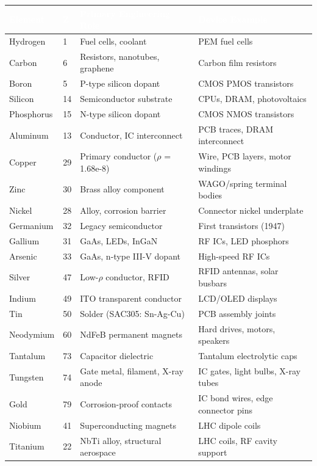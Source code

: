 \documentclass[11pt,letterpaper]{article}
\newcommand{\tableheader}[1]{\textbf{\sffamily\textcolor{white}{#1}}}
\begin{document}
\begin{center}
\begin{tabularx}{\textwidth}{L{1.8cm}C{0.7cm}XL{3cm}}
\toprule
{}
\tableheader{Element} & \tableheader{Z} & \tableheader{Primary Engineering Role} & \tableheader{Device Example} \\
\midrule
Hydrogen & 1 & Fuel cells, coolant & PEM fuel cells \\
Carbon & 6 & Resistors, nanotubes, graphene & Carbon film resistors \\
Boron & 5 & P-type silicon dopant & CMOS PMOS transistors \\
Silicon & 14 & Semiconductor substrate & CPUs, DRAM, photovoltaics \\
Phosphorus & 15 & N-type silicon dopant & CMOS NMOS transistors \\
Aluminum & 13 & Conductor, IC interconnect & PCB traces, DRAM interconnect \\
Copper & 29 & Primary conductor ($\rho$ = 1.68e-8) & Wire, PCB layers, motor windings \\
Zinc & 30 & Brass alloy component & WAGO/spring terminal bodies \\
Nickel & 28 & Alloy, corrosion barrier & Connector nickel underplate \\
Germanium & 32 & Legacy semiconductor & First transistors (1947) \\
Gallium & 31 & GaAs, LEDs, InGaN & RF ICs, LED phosphors \\
Arsenic & 33 & GaAs, n-type III-V dopant & High-speed RF ICs \\
Silver & 47 & Low-$\rho$ conductor, RFID & RFID antennas, solar busbars \\
Indium & 49 & ITO transparent conductor & LCD/OLED displays \\
Tin & 50 & Solder (SAC305: Sn-Ag-Cu) & PCB assembly joints \\
Neodymium & 60 & NdFeB permanent magnets & Hard drives, motors, speakers \\
Tantalum & 73 & Capacitor dielectric & Tantalum electrolytic caps \\
Tungsten & 74 & Gate metal, filament, X-ray anode & IC gates, light bulbs, X-ray tubes \\
Gold & 79 & Corrosion-proof contacts & IC bond wires, edge connector pins \\
Niobium & 41 & Superconducting magnets & LHC dipole coils \\
Titanium & 22 & NbTi alloy, structural aerospace & LHC coils, RF cavity support \\
\bottomrule
\end{tabularx}
\end{center}
\end{document}

